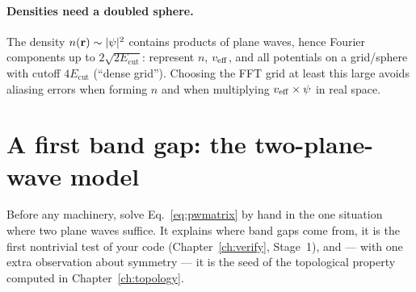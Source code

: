 \paragraph{Densities need a doubled sphere.} The density $n(\mathbf{r}) \sim
|\psi|^2$ contains products of plane waves, hence Fourier components up to
$2\sqrt{2E_{\mathrm{cut}}}$: represent $n$, $v_{\mathrm{eff}}$, and all potentials on a
grid/sphere with cutoff $4E_{\mathrm{cut}}$ (``dense grid''). Choosing the
FFT grid at least this large avoids aliasing errors when forming
$n$ and when multiplying $v_{\mathrm{eff}} \times \psi$ in real space.

\section{A first band gap: the two-plane-wave model}
\label{sec:nfe}

Before any machinery, solve Eq.~\eqref{eq:pwmatrix} by hand in the one
situation where two plane waves suffice. It explains where band gaps come
from, it is the first nontrivial test of your code (Chapter~\ref{ch:verify},
Stage~1), and --- with one extra observation about symmetry --- it is the
seed of the topological property computed in Chapter~\ref{ch:topology}.


